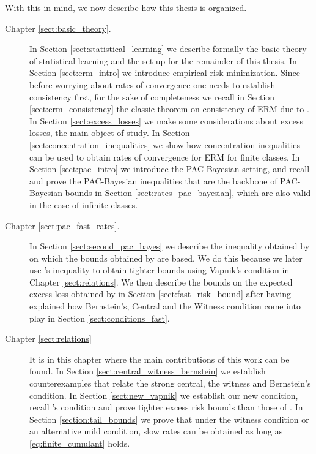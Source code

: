 \documentclass{uvamath}
\theoremstyle{remark}
\theoremstyle{definition}
\theoremstyle{definition}
\theoremstyle{definition}
\theoremstyle{definition}
\theoremstyle{definition}
\begin{document}
With this in mind, we now describe how this thesis is organized.
\begin{description}
\item[Chapter \ref{sect:basic_theory}.] In Section
  \ref{sect:statistical_learning} we describe formally the basic
  theory of statistical learning and the set-up for the remainder of
  this thesis. In Section \ref{sect:erm_intro} we introduce empirical
  risk minimization. Since before worrying about rates of convergence
  one needs to establish consistency first, for the sake of
  completeness we recall in Section \ref{sect:erm_consistency} the
  classic theorem on consistency of ERM due to
  \citet{vapnik_necessary_1991}. In Section \ref{sect:excess_losses}
  we make some considerations about excess losses, the main object of
  study. In Section \ref{sect:concentration_inequalities} we show how
  concentration inequalities can be used to obtain rates of
  convergence for ERM for finite classes. In Section
  \ref{sect:pac_intro} we introduce the PAC-Bayesian setting, and
  recall and prove the PAC-Bayesian inequalities that are the backbone
  of PAC-Bayesian bounds in Section \ref{sect:rates_pac_bayesian},
  which are also valid in the case of infinite classes.

\item[Chapter \ref{sect:pac_fast_rates}.] In Section
  \ref{sect:second_pac_bayes} we describe the inequality obtained by
  \citet{zhang_information-theoretic_2006} on which the bounds
  obtained by \citet{grunwald_fast_2016} are based. We do this because
  we later use \citeauthor{zhang_information-theoretic_2006}'s
  inequality to obtain tighter bounds using Vapnik's condition in
  Chapter \ref{sect:relations}. We then describe the bounds on the
  expected excess loss obtained by \citet{grunwald_fast_2016}
  in Section \ref{sect:fast_risk_bound} after having explained how
  Bernstein's, Central and the Witness condition come into play in
  Section \ref{sect:conditions_fast}.

\item[Chapter \ref{sect:relations}] It is in this chapter where the
  main contributions of this work can be found. In Section
  \ref{sect:central_witness_bernstein} we establish counterexamples
  that relate the strong central, the witness and Bernstein's
  condition. In Section \ref{sect:new_vapnik} we establish our new
  condition, recall \citeauthor{vapnik_statistical_1998}'s condition
  and prove tighter excess risk bounds than those of
  \citet{grunwald_fast_2016}. In Section \ref{section:tail_bounds} we
  prove that under the witness condition or an alternative mild
  condition, slow rates can be obtained as long as
  \eqref{eq:finite_cumulant} holds.


\end{description}
\end{document}
